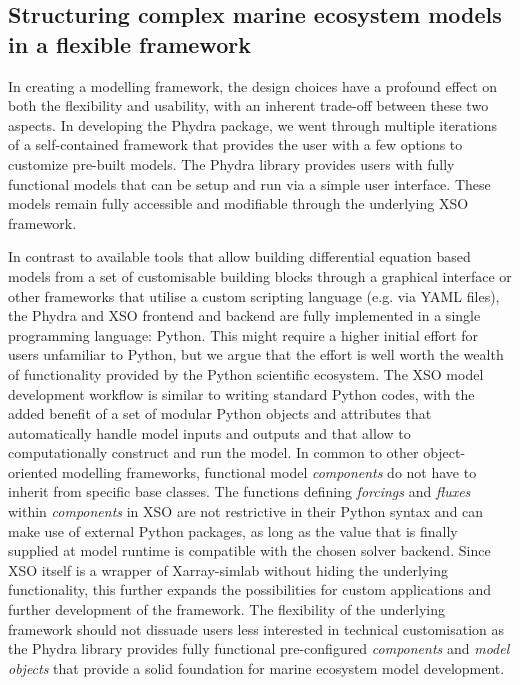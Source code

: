 \documentclass[journal abbreviation, manuscript]{copernicus}
\begin{document}
\subsection{Structuring complex marine ecosystem models in a flexible framework}

In creating a modelling framework, the design choices have a profound effect on both the flexibility and usability, with an inherent trade-off between these two aspects. In developing the Phydra package, we went through multiple iterations of a self-contained framework that provides the user with a few options to customize pre-built models. The Phydra library provides users with fully functional models that can be setup and run via a simple user interface. These models remain fully accessible and modifiable through the underlying XSO framework.

In contrast to available tools that allow building differential equation based models from a set of customisable building blocks through a graphical interface or other frameworks that utilise a custom scripting language (e.g. via YAML files), the Phydra and XSO frontend and backend are fully implemented in a single programming language: Python. This might require a higher initial effort for users unfamiliar to Python, but we argue that the effort is well worth the wealth of functionality provided by the Python scientific ecosystem. The XSO model development workflow is similar to writing standard Python codes, with the added benefit of a set of modular Python objects and attributes that automatically handle model inputs and outputs and that allow to computationally construct and run the model. In common to other object-oriented modelling frameworks, functional model \textit{components} do not have to inherit from specific base classes. The functions defining \textit{forcings} and \textit{fluxes} within \textit{components} in XSO are not restrictive in their Python syntax and can make use of external Python packages, as long as the value that is finally supplied at model runtime is compatible with the chosen solver backend. Since XSO itself is a wrapper of Xarray-simlab without hiding the underlying functionality, this further expands the possibilities for custom applications and further development of the framework. The flexibility of the underlying framework should not dissuade users less interested in technical customisation as the Phydra library provides fully functional pre-configured \textit{components} and \textit{model objects} that provide a solid foundation for marine ecosystem model development.
\end{document}
